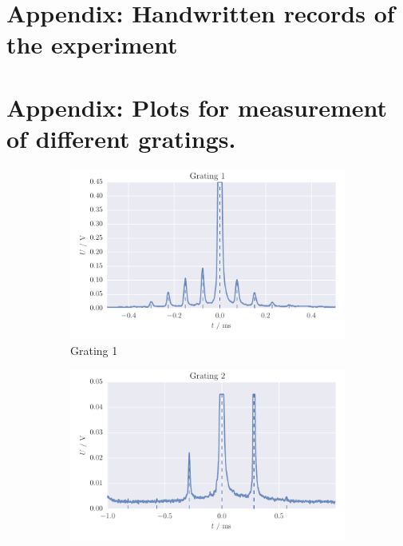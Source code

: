 \section{Appendix: Handwritten records of the experiment}
\label{sec:records}


\section{Appendix: Plots for measurement of different gratings.}
\label{sec:appendix_gratings_plots}
\begin{figure}
    \centering
    \begin{subfigure}[b]{\mpltw}
        \includegraphics[width=\textwidth]{figures/gratings_maxi1.pdf}
        \caption{Grating 1}
        \label{fig:gratings_maxi1}
    \end{subfigure}\quad
    \begin{subfigure}[b]{\mpltw}
        \includegraphics[width=\textwidth]{figures/gratings_maxi2.pdf}

\end{subfigure}
\end{figure}
